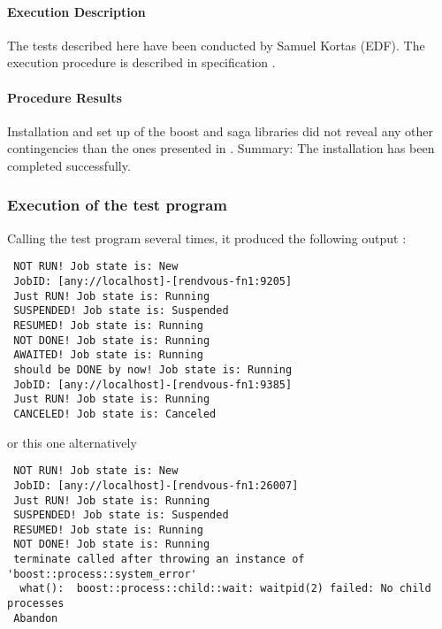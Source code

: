 \paragraph{Execution Description}

The tests described here have been conducted by Samuel Kortas (EDF). The
execution procedure is described in specification
.

\paragraph{Procedure Results}


Installation and set up of the boost and saga libraries did 
not reveal any other contingencies than the ones presented
in . Summary: The installation has been completed successfully.


\subsubsection{Execution of the test program}

Calling the test program several times, it produced the following output :

\begin{lstlisting}
 NOT RUN! Job state is: New      
 JobID: [any://localhost]-[rendvous-fn1:9205]
 Just RUN! Job state is: Running  
 SUSPENDED! Job state is: Suspended
 RESUMED! Job state is: Running  
 NOT DONE! Job state is: Running  
 AWAITED! Job state is: Running  
 should be DONE by now! Job state is: Running  
 JobID: [any://localhost]-[rendvous-fn1:9385]
 Just RUN! Job state is: Running  
 CANCELED! Job state is: Canceled 
\end{lstlisting}

or this one alternatively

\begin{lstlisting}
 NOT RUN! Job state is: New      
 JobID: [any://localhost]-[rendvous-fn1:26007]
 Just RUN! Job state is: Running  
 SUSPENDED! Job state is: Suspended
 RESUMED! Job state is: Running  
 NOT DONE! Job state is: Running  
 terminate called after throwing an instance of 'boost::process::system_error'
  what():  boost::process::child::wait: waitpid(2) failed: No child processes
 Abandon
\end{lstlisting}


